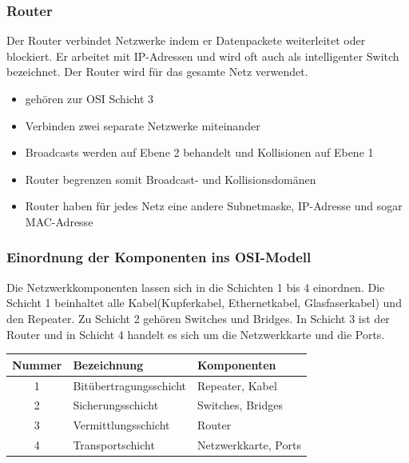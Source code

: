 \documentclass[12pt,a4paper]{article}
\begin{document}
		\subsubsection{Router}
			Der Router verbindet Netzwerke indem er Datenpackete weiterleitet oder blockiert. Er arbeitet mit IP-Adressen und wird oft auch als intelligenter Switch bezeichnet. Der Router wird für das gesamte Netz verwendet.
			\begin{center}
			\end{center}
			\begin{itemize}
				\item gehören zur OSI Schicht 3
				\item Verbinden zwei separate Netzwerke miteinander
				\item Broadcasts werden auf Ebene 2 behandelt und Kollisionen auf Ebene 1
				\item Router begrenzen somit Broadcast- und Kollisionsdomänen
				\item Router haben für jedes Netz eine andere Subnetmaske, IP-Adresse und sogar MAC-Adresse
			\end{itemize}
		
		\subsubsection{Einordnung der Komponenten ins OSI-Modell}
			Die Netzwerkkomponenten lassen sich in die Schichten 1 bis 4 einordnen. Die Schicht 1 beinhaltet alle Kabel(Kupferkabel, Ethernetkabel, Glasfaserkabel) und den Repeater. Zu Schicht 2 gehören Switches und Bridges. In Schicht 3 ist der Router und in Schicht 4 handelt es sich um die Netzwerkkarte und die Ports.
			\begin{center}
				\renewcommand{\arraystretch}{1.5}
					\begin{tabularx}{17cm}{|c|X|X|}
						\hline
						\cellcolor{cyan!60!white}\textbf{Nummer} & \cellcolor{cyan!60!white}\textbf{Bezeichnung} & \cellcolor{cyan!60!white}\textbf{Komponenten}\\
						\hline
						1 & Bitübertragungsschicht & Repeater, Kabel\\
						\hline
						2 & Sicherungsschicht & Switches, Bridges\\
						\hline
						3 & Vermittlungsschicht & Router\\
						\hline
						4 & Transportschicht & Netzwerkkarte, Ports\\
						\hline
					\end{tabularx}
			\end{center}
\end{document}
